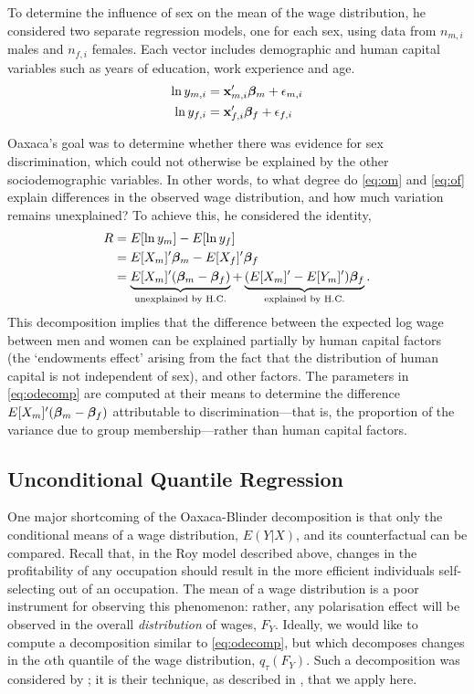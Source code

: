 To determine the influence of sex on the mean of the wage distribution, he considered two separate regression models, one for each sex, using data from $n_{m,i}$ males and $n_{f,i}$ females. Each vector includes demographic and human capital variables such as years of education, work experience and age.
\begin{align}
  \ln y_{m,i} &= \mathbf{x}_{m,i}'\boldsymbol{\beta}_m + \epsilon_{m,i} \label{eq:om} \\
  \ln y_{f,i} &= \mathbf{x}_{f,i}'\boldsymbol{\beta}_f + \epsilon_{f,i} \label{eq:of}
\end{align}

Oaxaca's goal was to determine whether there was evidence for sex discrimination, which could not otherwise be explained by the other sociodemographic variables. In other words, to what degree do \eqref{eq:om} and \eqref{eq:of} explain differences in the observed wage distribution, and how much variation remains unexplained? To achieve this, he considered the identity,
\begin{align}
  R &= E[\ln y_{m}] - E[\ln y_{f}] \\
  &=  E[X_m]'\boldsymbol{\beta}_m -  E[X_f]'\boldsymbol{\beta}_f \notag \\
  &= \underbrace{E[X_m]'(\boldsymbol{\beta}_m - \boldsymbol{\beta}_f)}_{\text{unexplained by H.C.}} + \underbrace{(E[X_m]'-E[Y_m]')\boldsymbol{\beta}_f}_{\text{explained by H.C.}}. \label{eq:odecomp}
\end{align}
This decomposition implies that the difference between the expected log wage between men and women can be explained partially by human capital factors (the `endowments effect' arising from the fact that the distribution of human capital is not independent of sex), and other factors. The parameters in \eqref{eq:odecomp} are computed at their means to determine the difference $E[X_m]'(\boldsymbol{\beta}_m - \boldsymbol{\beta}_f)$ attributable to discrimination---that is, the proportion of the variance due to group membership---rather than human capital factors. 

\subsection{Unconditional Quantile Regression}
One major shortcoming of the Oaxaca-Blinder decomposition is that only the conditional means of a wage distribution, $E(Y|X)$, and its counterfactual can be compared. Recall that, in the Roy model described above, changes in the profitability of any occupation should result in the more efficient individuals self-selecting out of an occupation. The mean of a wage distribution is a poor instrument for observing this phenomenon: rather, any polarisation effect will be observed in the overall {\em distribution} of wages, $F_Y$. Ideally, we would like to compute a decomposition similar to \eqref{eq:odecomp}, but which decomposes changes in the $\alpha$th quantile of the wage distribution, $q_\tau(F_Y)$. Such a decomposition was considered by \citet{Firpo2011}; it is their technique, as described in \citet{Firpo2009}, that we apply here.

